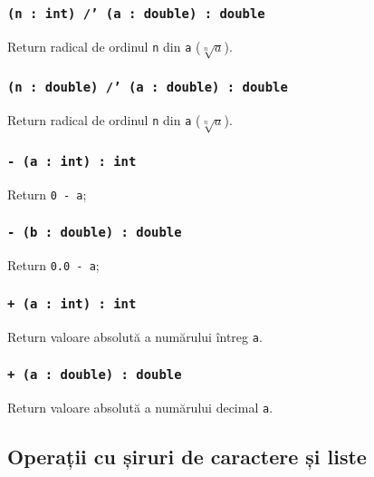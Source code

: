 \subsubsection{\texttt{(n : int) /' (a : double) : double}}

Return radical de ordinul \texttt{n} din \texttt{a} ($\sqrt[n]{a}$).

\subsubsection{\texttt{(n : double) /' (a : double) : double}}

Return radical de ordinul \texttt{n} din \texttt{a} ($\sqrt[n]{a}$).


\subsubsection{\texttt{- (a : int) : int}}

Return \texttt{0 - a};

\subsubsection{\texttt{- (b : double) : double}}

Return \texttt{0.0 - a};

\subsubsection{\texttt{+ (a : int) : int}}

Return valoare absolută a numărului întreg \texttt{a}.

\subsubsection{\texttt{+ (a : double) : double}}

Return valoare absolută a numărului decimal \texttt{a}.

\subsection{Operații cu șiruri de caractere și liste}

